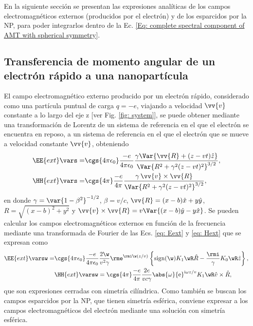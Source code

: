 En la siguiente sección se presentan las expresiones analíticas de los campos electromagnéticos externos (producidos por el electrón) y de los esparcidos por la NP, para poder integrarlos dentro de la Ec. \eqref{Eq: complete spectral component of AMT with spherical symmetry}.
%
%
\subsection{Transferencia de momento angular de un electrón rápido a una nanopartícula}
El campo electromagnético externo producido por un electrón rápido, considerado como una partícula puntual de carga $q=-e$, viajando a velocidad $\vv{v}$ constante a lo largo del eje z [ver Fig. \ref{fig: system}], se puede obtener mediante una transformación de Lorentz de un sistema de referencia en el que el electrón se encuentra en reposo, a un sistema de referencia en el que el electrón que se mueve a velocidad constante $\vv{v}$, obteniendo \cite{jackson}
\begin{align}
\EE{ext}\vars =& \cgs{4\pi\epsilon_0}\frac{-e}{4\pi\epsilon_0}\frac{\gamma \Var{\vv{R}+(z-vt)\hat{z}}}{\Var{R^2+\gamma^2(z-vt)^2}^{3/2}}, \label{eq: Eext}\\
\HH{ext}\vars =& \cgs{4\pi}\frac{-e}{4\pi}\frac{\gamma \, \vv{v}\times\vv{R}}{\Var{R^2+\gamma^2(z-vt)^2}^{3/2}}, \label{eq: Hext}
\end{align}
en donde $\gamma = \var{1-\beta^2}^{-1/2}$, $\beta = v/c$, $\vv{R}=(x-b)\hat{x}+y\hat{y}$, $R = \sqrt{(x-b)^2+y^2}$ y $\vv{v}\times\vv{R}=v\Var{(x-b)\hat{y}-y\hat{x}}$. Se pueden calcular los campos electromagnéticos externos en función de la frecuencia mediante una transformada de Fourier de las Ecs. \eqref{eq: Eext} y \eqref{eq: Hext} que se expresan como \cite{maciel2019electromagnetic}
\begin{align}
\EE{ext}\varsw = &\cgs{4\pi\epsilon_0}\frac{-e}{4\pi\epsilon_0}  \frac{2\w}{v^2 \gamma} \rme^{\rmi \w (z/v)} \left\{ {\rm sign}(\w) K_1\wR\hat{R} - \frac{\rmi}{\gamma}K_0\wR \hat{z}\right\},\\
&\HH{ext}\varsw = \cgs{4\pi}\frac{-e}{4\pi}\frac{2e}{v c \gamma} \abs{\omega} {\rm e}^{{\rm i}\omega z /v} K_1\wR \hat{v}\times\hat{R},
\end{align}
que son expresiones cerradas con simetría cilíndrica. Como también se buscan los campos esparcidos por la NP, que tienen simetría esférica, conviene expresar a los campos electromagnéticos del electrón mediante una solución con simetría esférica. 

